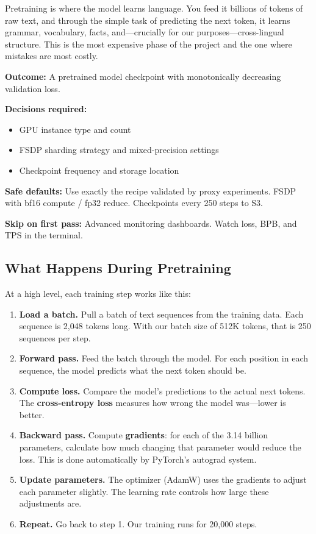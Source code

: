 \documentclass[11pt,a4paper]{article}
\begin{document}
Pretraining is where the model learns language. You feed it billions of tokens of raw text, and through the simple task of predicting the next token, it learns grammar, vocabulary, facts, and---crucially for our purposes---cross-lingual structure. This is the most expensive phase of the project and the one where mistakes are most costly.

\begin{buildnow}
\textbf{Outcome:} A pretrained model checkpoint with monotonically decreasing validation loss.

\textbf{Decisions required:}
\begin{itemize}[nosep]
  \item GPU instance type and count
  \item FSDP sharding strategy and mixed-precision settings
  \item Checkpoint frequency and storage location
\end{itemize}

\textbf{Safe defaults:} Use exactly the recipe validated by proxy experiments. FSDP with bf16 compute / fp32 reduce. Checkpoints every 250 steps to S3.

\textbf{Skip on first pass:} Advanced monitoring dashboards. Watch loss, BPB, and TPS in the terminal.
\end{buildnow}

\subsection{What Happens During Pretraining}

At a high level, each training step works like this:

\begin{enumerate}
    \item \textbf{Load a batch.} Pull a batch of text sequences from the training data. Each sequence is 2,048 tokens long. With our batch size of 512K tokens, that is 250 sequences per step.
    \item \textbf{Forward pass.} Feed the batch through the model. For each position in each sequence, the model predicts what the next token should be.
    \item \textbf{Compute loss.} Compare the model's predictions to the actual next tokens. The \textbf{cross-entropy loss} measures how wrong the model was---lower is better.
    \item \textbf{Backward pass.} Compute \textbf{gradients}: for each of the 3.14 billion parameters, calculate how much changing that parameter would reduce the loss. This is done automatically by PyTorch's autograd system.
    \item \textbf{Update parameters.} The optimizer (AdamW) uses the gradients to adjust each parameter slightly. The learning rate controls how large these adjustments are.
    \item \textbf{Repeat.} Go back to step 1. Our training runs for 20,000 steps.
\end{enumerate}
\end{document}
